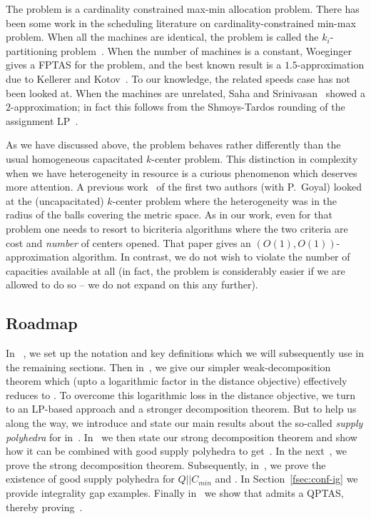 The \cckp problem is a cardinality constrained max-min allocation problem. There has been some work in the scheduling literature on cardinality-constrained min-max problem.
When all the machines are identical, the problem is called the $k_i$-partitioning problem~\cite{BabelKK98}.
When the number of machines is a constant, Woeginger~\cite{Woe05} gives a FPTAS for the problem, and the best known result is a $1.5$-approximation due to Kellerer and Kotov~\cite{KellererK11}.
To our knowledge, the related speeds case has not been looked at. When the machines are unrelated,  Saha and Srinivasan~\cite{SahaS10} showed a $2$-approximation; in fact this follows from the Shmoys-Tardos rounding of the assignment LP~\cite{ShmoysT93}.\smallskip

As we have discussed above, the \mckc problem behaves rather differently than the usual homogeneous capacitated $k$-center problem. This distinction in complexity when we have heterogeneity  in resource is a curious phenomenon which deserves more attention.
A previous work~\cite{ChakrabartyGK16} of the first two authors (with P.~Goyal) looked at the (uncapacitated) $k$-center problem where the heterogeneity was in the radius of the balls covering the metric space.
As in our work, even for that problem one needs to resort to bicriteria algorithms where the two criteria are cost and {\em number} of centers opened. That paper gives an $\left(O(1),O(1)\right)$-approximation algorithm.
In contrast, we do not wish to violate the number of capacities available at all (in fact, the problem is considerably easier if we are allowed to do so -- we do not expand on this any further).


\subsection{Roadmap}
In ~, we set up the notation and key definitions which we will subsequently use in the remaining sections. Then in~, we give our simpler weak-decomposition theorem which (upto a logarithmic factor in the distance objective) effectively reduces \mckc to \cckp. To overcome this logarithmic loss in the distance objective, we turn to an LP-based approach and a stronger decomposition theorem. But to help us along the way, we introduce and state our main results about the so-called \emph{supply polyhedra} for \cckp in~. In~ we then state our strong decomposition theorem and show how it can be combined with good supply polyhedra to get~. In the next~, we prove the strong decomposition theorem. Subsequently, in~, we prove the existence of good supply polyhedra for $Q || C_{min}$ and \cckp. In Section~\ref{fsec:conf-ig} we provide integrality gap examples.
Finally in~ we show that \cckp admits a QPTAS, thereby proving~.




